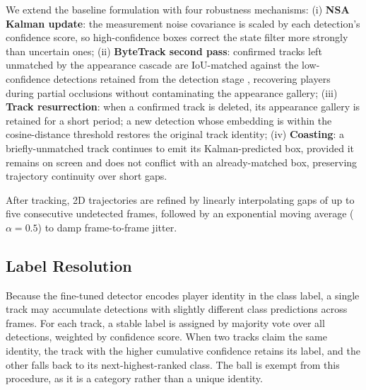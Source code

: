 We extend the baseline formulation with four robustness mechanisms:
(i) \textbf{NSA Kalman update}: the measurement noise covariance is scaled by each
detection's confidence score, so high-confidence boxes correct the state filter
more strongly than uncertain ones;
(ii) \textbf{ByteTrack second pass}: confirmed tracks left unmatched by the
appearance cascade are IoU-matched against the low-confidence detections retained
from the detection stage \cite{bytetrack}, recovering players during partial
occlusions without contaminating the appearance gallery;
(iii) \textbf{Track resurrection}: when a confirmed track is deleted, its appearance
gallery is retained for a short period; a new detection whose embedding is within
the cosine-distance threshold restores the original track identity;
(iv) \textbf{Coasting}: a briefly-unmatched track continues to emit its
Kalman-predicted box, provided it remains on screen and does not conflict with an
already-matched box, preserving trajectory continuity over short gaps.

After tracking, 2D trajectories are refined by linearly interpolating gaps of up to
five consecutive undetected frames, followed by an exponential moving average
($\alpha = 0.5$) to damp frame-to-frame jitter.

\subsection{Label Resolution}
Because the fine-tuned detector encodes player identity in the class label, a single
track may accumulate detections with slightly different class predictions across
frames.
For each track, a stable label is assigned by majority vote over all detections,
weighted by confidence score.
When two tracks claim the same identity, the track with the higher cumulative
confidence retains its label, and the other falls back to its next-highest-ranked
class.
The ball is exempt from this procedure, as it is a category rather than a unique
identity.
